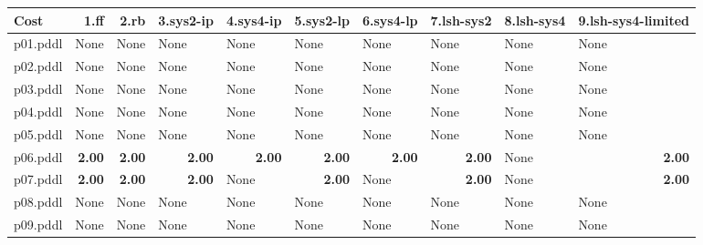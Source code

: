 \documentclass{article}
\begin{document}
\begin{tabular}{@{}lrrrrrrrrr@{}}
Cost & 1.ff & 2.rb & 3.sys2-ip & 4.sys4-ip & 5.sys2-lp & 6.sys4-lp & 7.lsh-sys2 & 8.lsh-sys4 & 9.lsh-sys4-limited \\
\midrule
p01.pddl & \multicolumn{1}{|l|}{None} & \multicolumn{1}{|l|}{None} & \multicolumn{1}{|l|}{None} & \multicolumn{1}{|l|}{None} & \multicolumn{1}{|l|}{None} & \multicolumn{1}{|l|}{None} & \multicolumn{1}{|l|}{None} & \multicolumn{1}{|l|}{None} & \multicolumn{1}{|l|}{None} \\
p02.pddl & \multicolumn{1}{|l|}{None} & \multicolumn{1}{|l|}{None} & \multicolumn{1}{|l|}{None} & \multicolumn{1}{|l|}{None} & \multicolumn{1}{|l|}{None} & \multicolumn{1}{|l|}{None} & \multicolumn{1}{|l|}{None} & \multicolumn{1}{|l|}{None} & \multicolumn{1}{|l|}{None} \\
p03.pddl & \multicolumn{1}{|l|}{None} & \multicolumn{1}{|l|}{None} & \multicolumn{1}{|l|}{None} & \multicolumn{1}{|l|}{None} & \multicolumn{1}{|l|}{None} & \multicolumn{1}{|l|}{None} & \multicolumn{1}{|l|}{None} & \multicolumn{1}{|l|}{None} & \multicolumn{1}{|l|}{None} \\
p04.pddl & \multicolumn{1}{|l|}{None} & \multicolumn{1}{|l|}{None} & \multicolumn{1}{|l|}{None} & \multicolumn{1}{|l|}{None} & \multicolumn{1}{|l|}{None} & \multicolumn{1}{|l|}{None} & \multicolumn{1}{|l|}{None} & \multicolumn{1}{|l|}{None} & \multicolumn{1}{|l|}{None} \\
p05.pddl & \multicolumn{1}{|l|}{None} & \multicolumn{1}{|l|}{None} & \multicolumn{1}{|l|}{None} & \multicolumn{1}{|l|}{None} & \multicolumn{1}{|l|}{None} & \multicolumn{1}{|l|}{None} & \multicolumn{1}{|l|}{None} & \multicolumn{1}{|l|}{None} & \multicolumn{1}{|l|}{None} \\
p06.pddl & \textbf{2.00} & \textbf{2.00} & \textbf{2.00} & \textbf{2.00} & \textbf{2.00} & \textbf{2.00} & \textbf{2.00} & \multicolumn{1}{|l|}{None} & \textbf{2.00} \\
p07.pddl & \textbf{2.00} & \textbf{2.00} & \textbf{2.00} & \multicolumn{1}{|l|}{None} & \textbf{2.00} & \multicolumn{1}{|l|}{None} & \textbf{2.00} & \multicolumn{1}{|l|}{None} & \textbf{2.00} \\
p08.pddl & \multicolumn{1}{|l|}{None} & \multicolumn{1}{|l|}{None} & \multicolumn{1}{|l|}{None} & \multicolumn{1}{|l|}{None} & \multicolumn{1}{|l|}{None} & \multicolumn{1}{|l|}{None} & \multicolumn{1}{|l|}{None} & \multicolumn{1}{|l|}{None} & \multicolumn{1}{|l|}{None} \\
p09.pddl & \multicolumn{1}{|l|}{None} & \multicolumn{1}{|l|}{None} & \multicolumn{1}{|l|}{None} & \multicolumn{1}{|l|}{None} & \multicolumn{1}{|l|}{None} & \multicolumn{1}{|l|}{None} & \multicolumn{1}{|l|}{None} & \multicolumn{1}{|l|}{None} & \multicolumn{1}{|l|}{None} \\

\end{tabular}
\end{document}
